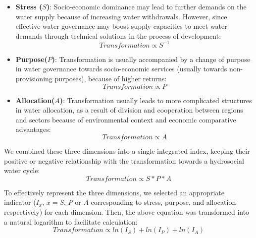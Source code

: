 	\begin{itemize}
		\item \textbf{Stress ($S$)}: Socio-economic dominance may lead to further demands on the water supply because of increasing water withdrawals. However, since effective water governance may boost supply capacities to meet water demands through technical solutions in the process of development:
		\begin{equation}
			Transformation \propto S^{-1}
		\end{equation}


		\item \textbf{Purpose($P$)}: Transformation is usually accompanied by a change of purpose in water governance towards socio-economic services (usually towards non-provisioning purposes), because of higher returns:
		\begin{equation}
			Transformation \propto P
		\end{equation}

		\item \textbf{Allocation($A$)}: Transformation usually leads to more complicated structures in water allocation, as a result of division and cooperation between regions and sectors because of environmental context and economic comparative advantages:
		\begin{equation}
			Transformation \propto A
		\end{equation}

	\end{itemize}

	We combined these three dimensions into a single integrated index, keeping their positive or negative relationship with the transformation towards a hydrosocial water cycle:
	\begin{equation}
		Transformation \propto S*P*A
	\end{equation}

	To effectively represent the three dimensions, we selected an appropriate indicator ($I_x$, $x=S$, $P$ or $A$ corresponding to stress, purpose, and allocation respectively) for each dimension. Then, the above equation was transformed into a natural logarithm to facilitate calculation:
	\begin{equation}
		Transformation \propto ln(I_S) + ln(I_P) + ln(I_A)
	\end{equation}

